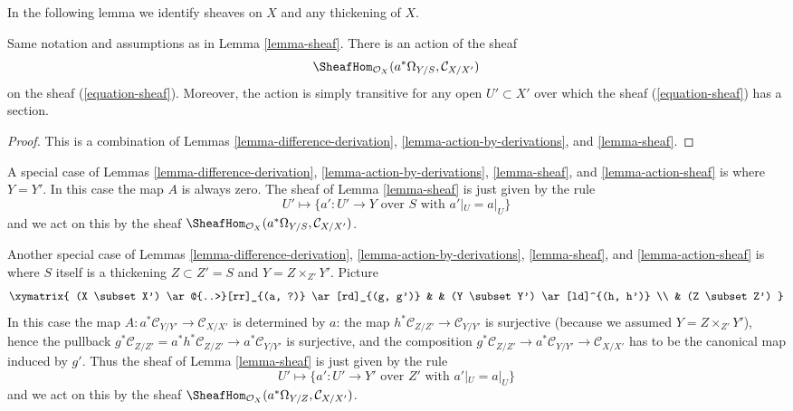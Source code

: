 \noindent
In the following lemma we identify sheaves on $X$ and any thickening
of $X$.

\begin{lemma}
\label{lemma-action-sheaf}
Same notation and assumptions as in Lemma \ref{lemma-sheaf}.
There is an action of the sheaf
$$
\SheafHom_{\mathcal{O}_X}(a^*\Omega_{Y/S}, \mathcal{C}_{X/X'})
$$
on the sheaf (\ref{equation-sheaf}). Moreover, the action
is simply transitive for any open $U' \subset X'$ over which the sheaf
(\ref{equation-sheaf}) has a section.
\end{lemma}

\begin{proof}
This is a combination of
Lemmas \ref{lemma-difference-derivation},
\ref{lemma-action-by-derivations},
and \ref{lemma-sheaf}.
\end{proof}

\begin{remark}
\label{remark-special-case}
A special case of
Lemmas \ref{lemma-difference-derivation},
\ref{lemma-action-by-derivations},
\ref{lemma-sheaf}, and
\ref{lemma-action-sheaf}
is where $Y = Y'$. In this case the map $A$ is always zero.
The sheaf of
Lemma \ref{lemma-sheaf}
is just given by the rule
$$
U' \mapsto
\{a' : U' \to Y\text{ over }S\text{ with } a'|_U = a|_U\}
$$
and we act on this by the sheaf
$\SheafHom_{\mathcal{O}_X}(a^*\Omega_{Y/S}, \mathcal{C}_{X/X'})$.
\end{remark}

\begin{remark}
\label{remark-another-special-case}
Another special case of
Lemmas \ref{lemma-difference-derivation},
\ref{lemma-action-by-derivations},
\ref{lemma-sheaf}, and
\ref{lemma-action-sheaf}
is where $S$ itself is a thickening $Z \subset Z' = S$
and $Y = Z \times_{Z'} Y'$. Picture
$$
\xymatrix{
(X \subset X') \ar@{..>}[rr]_{(a, ?)} \ar[rd]_{(g, g')} & &
(Y \subset Y') \ar[ld]^{(h, h')} \\
& (Z \subset Z')
}
$$
In this case the map $A : a^*\mathcal{C}_{Y/Y'} \to \mathcal{C}_{X/X'}$
is determined by $a$: the map
$h^*\mathcal{C}_{Z/Z'} \to \mathcal{C}_{Y/Y'}$ is surjective (because
we assumed $Y = Z \times_{Z'} Y'$),
hence the pullback $g^*\mathcal{C}_{Z/Z'} = a^*h^*\mathcal{C}_{Z/Z'} \to
a^*\mathcal{C}_{Y/Y'}$ is surjective, and the composition
$g^*\mathcal{C}_{Z/Z'} \to a^*\mathcal{C}_{Y/Y'} \to \mathcal{C}_{X/X'}$
has to be the canonical map induced by $g'$. Thus the sheaf of
Lemma \ref{lemma-sheaf}
is just given by the rule
$$
U' \mapsto
\{a' : U' \to Y'\text{ over }Z'\text{ with } a'|_U = a|_U\}
$$
and we act on this by the sheaf
$\SheafHom_{\mathcal{O}_X}(a^*\Omega_{Y/Z}, \mathcal{C}_{X/X'})$.
\end{remark}

